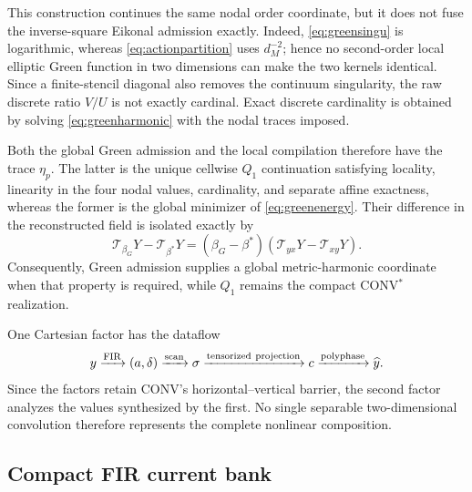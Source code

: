 \documentclass[journal]{IEEEtran}
\newcommand{\Tcal}{\mathcal{T}}
\begin{document}
This construction continues the same nodal order coordinate, but it does not
fuse the inverse-square Eikonal admission exactly. Indeed,
\eqref{eq:greensingu} is logarithmic, whereas
\eqref{eq:actionpartition} uses \(d_M^{-2}\); hence no second-order local
elliptic Green function in two dimensions can make the two kernels
identical. Since a finite-stencil diagonal also removes the continuum
singularity, the raw discrete ratio \(V/U\) is not exactly cardinal. Exact
discrete cardinality is obtained by solving \eqref{eq:greenharmonic} with the
nodal traces imposed.

Both the global Green admission and the local compilation therefore have the
trace \(\eta_p\). The latter is the unique cellwise \(Q_1\) continuation
satisfying locality, linearity in the four nodal values, cardinality, and
separate affine exactness, whereas the former is the global minimizer of
\eqref{eq:greenenergy}. Their difference in the reconstructed field is
isolated exactly by
\begin{equation}
 \Tcal_{\beta_G}Y-\Tcal_{\beta^*}Y
 =(\beta_G-\beta^*)(\Tcal_{yx}Y-\Tcal_{xy}Y).
 \label{eq:greenblenddefect}
\end{equation}
Consequently, Green admission supplies a global metric-harmonic coordinate
when that property is required, while \(Q_1\) remains the compact
CONV$^{*}$ realization.

One Cartesian factor has the dataflow
\begin{equation}
 y\xrightarrow{\rm FIR}(a,\delta)
 \xrightarrow{\rm scan}\sigma
 \xrightarrow{\rm tensorized\ projection}c
 \xrightarrow{\rm polyphase}\widehat y.
 \label{eq:starflow}
\end{equation}
Since the factors retain CONV's horizontal--vertical barrier, the second
factor analyzes the values synthesized by the first. No single separable
two-dimensional convolution therefore represents the complete nonlinear
composition.

\subsection{Compact FIR current bank}
\end{document}

